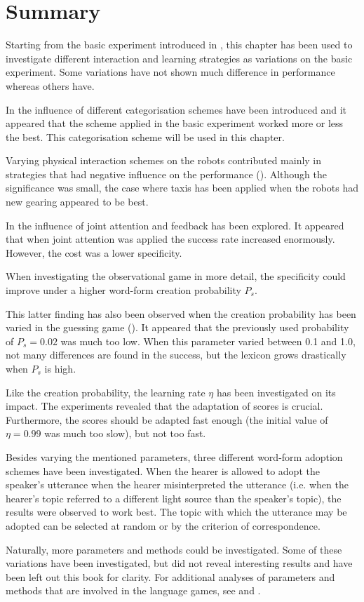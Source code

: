 
\section{Summary}

Starting from the basic experiment introduced in , this chapter has been used to investigate different interaction and learning strategies as variations on the basic experiment. Some variations have not shown much difference in performance whereas others have.


In  the influence of different categorisation schemes have been introduced and it appeared that the scheme applied in the basic experiment worked more or less the best. This categorisation scheme will be used in this chapter. 

Varying physical interaction schemes on the robots contributed mainly in strategies that had negative influence on the performance (). Although the significance was small, the case where taxis has been applied when the robots had new gearing appeared to be best.

In  the influence of joint attention and feedback has been explored. It appeared that when joint attention was applied the success rate increased enormously. However, the cost was a lower specificity.

When investigating the observational game in more detail, the specificity could improve under a higher word-form creation probability $P_s$. 

This latter finding has also been observed when the creation probability has been varied in the guessing game (). It appeared that the previously used probability of $P_s=0.02$ was much too low. When this parameter varied between 0.1 and 1.0, not many differences are found in the success, but the lexicon grows drastically when $P_s$ is high.

Like the creation probability, the learning rate $\eta$ has been investigated on its impact. The experiments revealed that the adaptation of scores is crucial. Furthermore, the scores should be adapted fast enough (the initial value of $\eta=0.99$ was much too slow), but not too fast.

Besides varying the mentioned parameters, three different word-form adoption schemes have been investigated. When the hearer is allowed to adopt the speaker's utterance when the hearer misinterpreted the utterance (i.e. when the hearer's topic referred to a different light source than the speaker's topic), the results were observed to work best. The topic with which the utterance may be adopted can be selected at random or by the criterion of correspondence. 


Naturally, more parameters and methods could be investigated. Some of these variations have been investigated, but did not reveal interesting results and have been left out this book for clarity. For additional analyses of parameters and methods that are involved in the language games, see \cite{dejong:2000} and \cite{kaplan:2000}.


